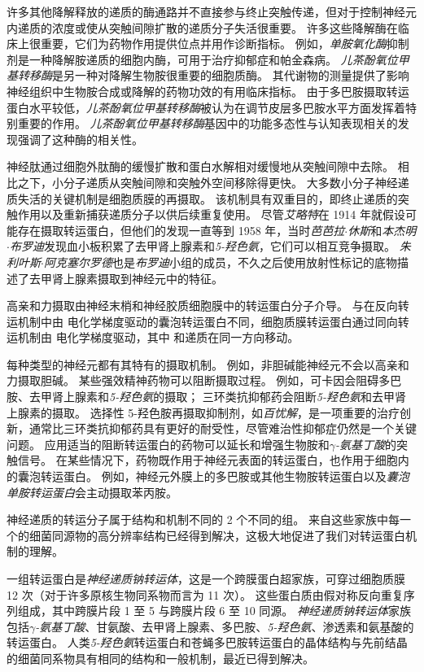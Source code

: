 许多其他降解释放的递质的酶通路并不直接参与终止突触传递，但对于控制神经元内递质的浓度或使从突触间隙扩散的递质分子失活很重要。
许多这些降解酶在临床上很重要，它们为药物作用提供位点并用作诊断指标。
例如，\textit{单胺氧化酶}抑制剂是一种降解胺递质的细胞内酶，可用于治疗抑郁症和帕金森病。
\textit{儿茶酚氧位甲基转移酶}是另一种对降解生物胺很重要的细胞质酶。
其代谢物的测量提供了影响神经组织中生物胺合成或降解的药物功效的有用临床指标。
由于多巴胺摄取转运蛋白水平较低，\textit{儿茶酚氧位甲基转移酶}被认为在调节皮层多巴胺水平方面发挥着特别重要的作用。
\textit{儿茶酚氧位甲基转移酶}基因中的功能多态性与认知表现相关的发现强调了这种酶的相关性。


神经肽通过细胞外肽酶的缓慢扩散和蛋白水解相对缓慢地从突触间隙中去除。
相比之下，小分子递质从突触间隙和突触外空间移除得更快。
大多数小分子神经递质失活的关键机制是细胞质膜的再摄取。
该机制具有双重目的，即终止递质的突触作用以及重新捕获递质分子以供后续重复使用。
尽管\textit{艾略特}在 1914 年就假设可能存在摄取转运蛋白，但他们的发现一直等到 1958 年，当时\textit{芭芭拉$\cdot$休斯}和\textit{本杰明$\cdot$布罗迪}发现血小板积累了去甲肾上腺素和\textit{5-羟色氨}，它们可以相互竞争摄取。
\textit{朱利叶斯$\cdot$阿克塞尔罗德}也是\textit{布罗迪}小组的成员，不久之后使用放射性标记的底物描述了去甲肾上腺素摄取到神经元中的特征。


高亲和力摄取由神经末梢和神经胶质细胞膜中的转运蛋白分子介导。
与在反向转运机制中由  电化学梯度驱动的囊泡转运蛋白不同，细胞质膜转运蛋白通过同向转运机制由  电化学梯度驱动，其中  和递质在同一方向移动。


每种类型的神经元都有其特有的摄取机制。
例如，非胆碱能神经元不会以高亲和力摄取胆碱。
某些强效精神药物可以阻断摄取过程。
例如，可卡因会阻碍多巴胺、去甲肾上腺素和\textit{5-羟色氨}的摄取；
三环类抗抑郁药会阻断\textit{5-羟色氨}和去甲肾上腺素的摄取。
选择性 5-羟色胺再摄取抑制剂，如\textit{百忧解}，是一项重要的治疗创新，通常比三环类抗抑郁药具有更好的耐受性，尽管难治性抑郁症仍然是一个关键问题。
应用适当的阻断转运蛋白的药物可以延长和增强生物胺和\textit{$\gamma$-氨基丁酸}的突触信号。
在某些情况下，药物既作用于神经元表面的转运蛋白，也作用于细胞内的囊泡转运蛋白。
例如，神经元外膜上的多巴胺或其他生物胺转运蛋白以及\textit{囊泡单胺转运蛋白}会主动摄取苯丙胺。


神经递质的转运分子属于结构和机制不同的 2 个不同的组。
来自这些家族中每一个的细菌同源物的高分辨率结构已经得到解决，这极大地促进了我们对转运蛋白机制的理解。


一组转运蛋白是\textit{神经递质钠转运体}，这是一个跨膜蛋白超家族，可穿过细胞质膜 12 次（对于许多原核生物同系物而言为 11 次）。
这些蛋白质由假对称反向重复序列组成，其中跨膜片段 1 至 5 与跨膜片段 6 至 10 同源。
\textit{神经递质钠转运体}家族包括\textit{$\gamma$-氨基丁酸}、甘氨酸、去甲肾上腺素、多巴胺、\textit{5-羟色氨}、渗透素和氨基酸的转运蛋白。
人类\textit{5-羟色氨}转运蛋白和苍蝇多巴胺转运蛋白的晶体结构与先前结晶的细菌同系物具有相同的结构和一般机制，最近已得到解决。


